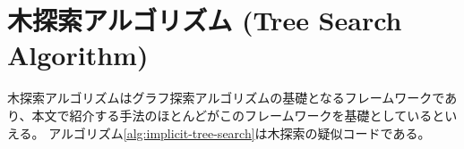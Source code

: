 \begin{comment}
\begin{table}
\caption{木探索とグラフ探索}
\label{tbl:tree-vs-graph-search}
\caption{木探索とグラフ探索の違い。状態の重複検出を行わない手法を木探索と呼ぶ。探索する状態空間が木であるか否かは関係しない。グラフ探索は重複検出を行うことで同じ状態を複数回無駄に探索することを防ぐ。重複検出のためには生成済みノードをすべて保存するデータ構造クローズドリストが必要になる。}
\begin{tabular}{c|ccc}
				& 重複検出  	  & 保存するノード & 完全性 \\
	木探索  		& 重複検出しない & オープンリストのみ & ループを含むグラフである場合停止性を満たさない \\
	グラフ探索 		& 重複検出する  & オープンリストとクローズドリスト & (状態空間が有限ならば)完全 \\ 
\end{tabular}
\end{table}


\begin{table}
\label{tbl:basic-priority}
\caption{ノードの展開順序。}
\begin{tabular}{c|cc}
	展開順序  	& プライオリティ 	& 性質 \\  
	幅優先	& $\arg \min_n d(n)$ & ユニットコストドメインだと最初に発見した解が最適解である \\
	深さ優先 	& $\arg \max_n d(n)$ & メモリ消費が少ない場合がある \\
	最良優先	& $\arg \min_n g(n)$ & 非負コストドメインで最適解が得られる \\
\end{tabular}
\end{table}
\end{comment}


\section{木探索アルゴリズム (Tree Search Algorithm)}
\label{sec:tree-search-algorithm}
木探索アルゴリズムはグラフ探索アルゴリズムの基礎となるフレームワークであり、本文で紹介する手法のほとんどがこのフレームワークを基礎としているといえる。
アルゴリズム\ref{alg:implicit-tree-search}は木探索の疑似コードである。

